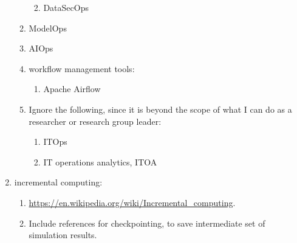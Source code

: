 \documentclass[letter,12pt]{article}
\begin{document}
\begin{enumerate}
\begin{enumerate}
\begin{enumerate}
\begin{enumerate}
			\end{enumerate}
		\item DataSecOps
		\end{enumerate}
	\item ModelOps
	\item AIOps
	\item workflow management tools: \vspace{-0.2cm}
		\begin{enumerate} \itemsep -2pt
		\item Apache Airflow
		\end{enumerate}
	\item Ignore the following, since it is beyond the scope of what I can do as a researcher or research group leader: \vspace{-0.2cm}
		\begin{enumerate} \itemsep -2pt
		\item ITOps
		\item IT operations analytics, ITOA
		\end{enumerate}
	\end{enumerate}
\item incremental computing: \vspace{-0.3cm}
	\begin{enumerate} \itemsep -2pt
	\item \url{https://en.wikipedia.org/wiki/Incremental_computing}.
	\item Include references for checkpointing, to save intermediate set of simulation results.
	\end{enumerate}
\end{enumerate}
















%
%
%

{\linespread{1}

%
%

}
%
\end{document}
